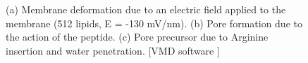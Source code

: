 \begin{figure}[t!]
\centering
\begin{minipage}[b]{0.26\linewidth}
\centering
{}
\end{minipage}
\begin{minipage}[b]{0.4\linewidth}
\centering
{}
\end{minipage}
\begin{minipage}[b]{0.26\linewidth}
\centering
{}
\end{minipage}
\caption[Snapshot from relevant membrane-peptide simulations]{(a) Membrane deformation due to an electric field applied to the membrane (512 lipids, E = -130 mV/nm). (b) Pore formation due to the action of the peptide. (c) Pore precursor due to Arginine insertion and water penetration. [VMD software \citet{HUMP96}]}
\label{fig:pore_pics}
\end{figure}


